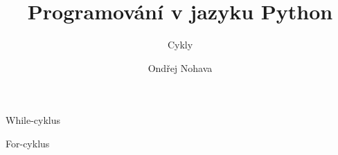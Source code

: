 \documentclass{beamer}
\title{Programování v jazyku Python}
\subtitle{Cykly}
\author{Ondřej Nohava}
\institute[DDMJH]{Dům dětí a mládeže Jindřichův Hradec}
\date{}
\begin{document}
\begin{frame}
\titlepage
\end{frame}

\begin{frame}[t]{While-cyklus}


\end{frame}


\begin{frame}[t]{For-cyklus}


\end{frame}
\end{document}
